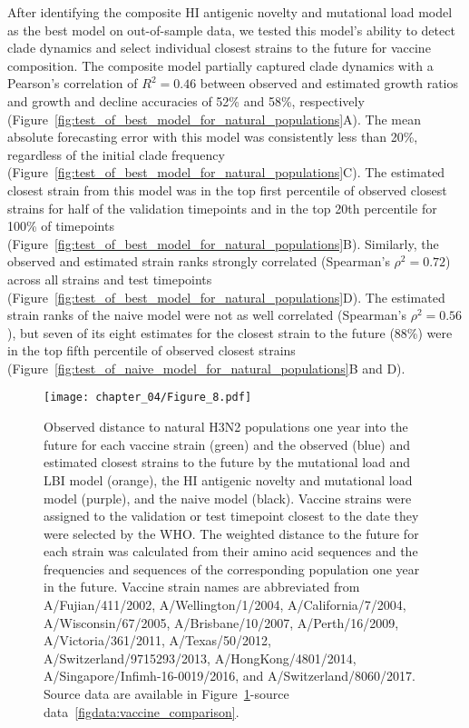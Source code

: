After identifying the composite HI antigenic novelty and mutational load model as the best model on out-of-sample data, we tested this model's ability to detect clade dynamics and select individual closest strains to the future for vaccine composition.
The composite model partially captured clade dynamics with a Pearson's correlation of $R^2 = 0.46$ between observed and estimated growth ratios and growth and decline accuracies of 52\% and 58\%, respectively (Figure~\ref{fig:test_of_best_model_for_natural_populations}A).
The mean absolute forecasting error with this model was consistently less than 20\%, regardless of the initial clade frequency (Figure~\ref{fig:test_of_best_model_for_natural_populations}C).
The estimated closest strain from this model was in the top first percentile of observed closest strains for half of the validation timepoints and in the top 20th percentile for 100\% of timepoints (Figure~\ref{fig:test_of_best_model_for_natural_populations}B).
Similarly, the observed and estimated strain ranks strongly correlated (Spearman's $\rho^2 = 0.72$) across all strains and test timepoints (Figure~\ref{fig:test_of_best_model_for_natural_populations}D).
The estimated strain ranks of the naive model were not as well correlated (Spearman's $\rho^2 = 0.56$), but seven of its eight estimates for the closest strain to the future (88\%) were in the top fifth percentile of observed closest strains (Figure~\ref{fig:test_of_naive_model_for_natural_populations}B and D).

\begin{figure}
  \texttt{[image: chapter\_04/Figure\_8.pdf]}
  \caption{
    Observed distance to natural H3N2 populations one year into the future for each vaccine strain (green) and the observed (blue) and estimated closest strains to the future by the mutational load and LBI model (orange), the HI antigenic novelty and mutational load model (purple), and the naive model (black).
    Vaccine strains were assigned to the validation or test timepoint closest to the date they were selected by the WHO.
    The weighted distance to the future for each strain was calculated from their amino acid sequences and the frequencies and sequences of the corresponding population one year in the future.
    Vaccine strain names are abbreviated from A/Fujian/411/2002, A/Wellington/1/2004, A/California/7/2004, A/Wisconsin/67/2005, A/Brisbane/10/2007, A/Perth/16/2009, A/Victoria/361/2011, A/Texas/50/2012, A/Switzerland/9715293/2013, A/HongKong/4801/2014, A/Singapore/Infimh-16-0019/2016, and A/Switzerland/8060/2017.
    Source data are available in Figure~\ref{fig:vaccine_comparison}-source data~\ref{figdata:vaccine_comparison}.
  }
  \label{fig:vaccine_comparison}
\end{figure}

